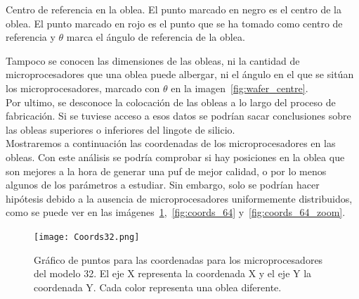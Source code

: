 \documentclass[spanish]{template/minim}
\begin{document}
\begin{marginfigure}
    \centering


    \caption[Centro de referencia en la oblea]{
        Centro de referencia en la oblea. El punto marcado en negro es el centro de la oblea. El punto marcado en rojo es el punto que se ha tomado como centro de referencia y $\theta$ marca el ángulo de referencia de la oblea.\label{fig:wafer_centre}
    }

\end{marginfigure}

Tampoco se conocen las dimensiones de las obleas, ni la cantidad de microprocesadores que una oblea puede albergar, ni el ángulo en el que se sitúan los microprocesadores, marcado con $\theta$ en la imagen~\ref{fig:wafer_centre}.\\

Por ultimo, se desconoce la colocación de las obleas a lo largo del proceso de fabricación. Si se tuviese acceso a esos datos se podrían sacar conclusiones sobre las obleas superiores o inferiores del lingote de silicio.\\

Mostraremos a continuación las coordenadas de los microprocesadores en las obleas. Con este análisis se podría comprobar si hay posiciones en la oblea que son mejores a la hora de generar una \gls{puf} de mejor calidad, o por lo menos algunos de los parámetros a estudiar. Sin embargo, solo se podrían hacer hipótesis debido a la ausencia de microprocesadores uniformemente distribuidos, como se puede ver en las imágenes~\ref{fig:coords_32},~\ref{fig:coords_64} y~\ref{fig:coords_64_zoom}.\\

\begin{fullwidth}
\begin{figure}[h]
    \centering
    \texttt{[image: Coords32.png]}
    \caption[Coordenadas para el modelo 32]{
        Gráfico de puntos para las coordenadas para los microprocesadores del modelo 32. El eje X representa la coordenada X y el eje Y la coordenada Y. Cada color representa una oblea diferente.\label{fig:coords_32}
    }

\end{figure}
\end{fullwidth}
\end{document}
